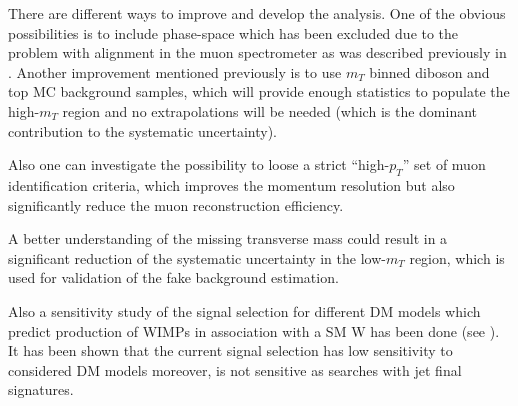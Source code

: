 There are different ways to improve and develop the analysis.
One of the obvious possibilities is to include phase-space which has been excluded due
to the problem with alignment in the muon spectrometer as was described previously in .
Another improvement mentioned previously is to use $m_T$ binned diboson and top MC background samples, which will provide enough statistics to populate the high-$m_T$ region and no extrapolations will be needed (which is the dominant contribution to the systematic uncertainty).

Also one can investigate the possibility to loose a strict ``high-$p_T$'' set of muon identification criteria, which improves the momentum resolution but also significantly reduce the muon reconstruction efficiency.


A better understanding of the missing transverse mass could result in a significant reduction of the systematic uncertainty in the low-$m_T$ region, which is used for validation of the fake background estimation.

Also a sensitivity study of the signal selection for different DM models which predict production of WIMPs in association with a SM W has been done (see ).
It has been shown that the current signal selection has low sensitivity to considered DM models moreover, is not sensitive as searches with jet final signatures.
